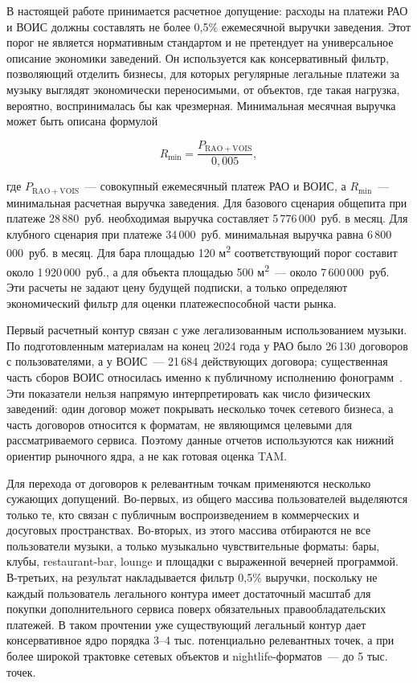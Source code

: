 В настоящей работе принимается расчетное допущение: расходы на платежи РАО и ВОИС должны составлять не более 0{,}5\% ежемесячной выручки заведения. Этот порог не является нормативным стандартом и не претендует на универсальное описание экономики заведений. Он используется как консервативный фильтр, позволяющий отделить бизнесы, для которых регулярные легальные платежи за музыку выглядят экономически переносимыми, от объектов, где такая нагрузка, вероятно, воспринималась бы как чрезмерная. Минимальная месячная выручка может быть описана формулой

\begin{equation*}
    R_{\min} = \frac{P_{\mathrm{RAO+VOIS}}}{0{,}005},
\end{equation*}

где $P_{\mathrm{RAO+VOIS}}$~--- совокупный ежемесячный платеж РАО и ВОИС, а $R_{\min}$~--- минимальная расчетная выручка заведения. Для базового сценария общепита при платеже 28\,880~руб. необходимая выручка составляет 5\,776\,000~руб. в месяц. Для клубного сценария при платеже 34\,000~руб. минимальная выручка равна 6\,800\,000~руб. в месяц. Для бара площадью 120 м\textsuperscript{2} соответствующий порог составит около 1\,920\,000~руб., а для объекта площадью 500 м\textsuperscript{2}~--- около 7\,600\,000~руб. Эти расчеты не задают цену будущей подписки, а только определяют экономический фильтр для оценки платежеспособной части рынка.

Первый расчетный контур связан с уже легализованным использованием музыки. По подготовленным материалам на конец 2024 года у РАО было 26\,130 договоров с пользователями, а у ВОИС~--- 21\,684 действующих договора; существенная часть сборов ВОИС относилась именно к публичному исполнению фонограмм~\cite{rao_annual_report_2024,vois_annual_report_2024}. Эти показатели нельзя напрямую интерпретировать как число физических заведений: один договор может покрывать несколько точек сетевого бизнеса, а часть договоров относится к форматам, не являющимся целевыми для рассматриваемого сервиса. Поэтому данные отчетов используются как нижний ориентир рыночного ядра, а не как готовая оценка TAM.

Для перехода от договоров к релевантным точкам применяются несколько сужающих допущений. Во-первых, из общего массива пользователей выделяются только те, кто связан с публичным воспроизведением в коммерческих и досуговых пространствах. Во-вторых, из этого массива отбираются не все пользователи музыки, а только музыкально чувствительные форматы: бары, клубы, restaurant-bar, lounge и площадки с выраженной вечерней программой. В-третьих, на результат накладывается фильтр 0{,}5\% выручки, поскольку не каждый пользователь легального контура имеет достаточный масштаб для покупки дополнительного сервиса поверх обязательных правообладательских платежей. В таком прочтении уже существующий легальный контур дает консервативное ядро порядка 3--4 тыс. потенциально релевантных точек, а при более широкой трактовке сетевых объектов и nightlife-форматов~--- до 5 тыс. точек.

